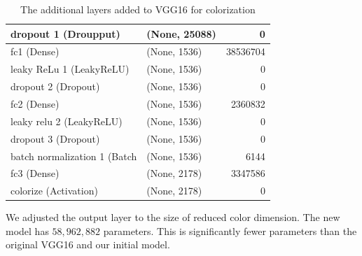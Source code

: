\documentclass[12pt]{article}
\begin{document}
\begin{table}[H]
	\caption{The additional layers added to VGG16 for colorization}
  	\centering
	\begin{tabular}{|l|l|r|}
		\hline 
		dropout 1 (Droupput)          &  (None, 25088)          &    0           \\ \hline
		fc1 (Dense)                   &  (None, 1536)           &    38536704    \\ \hline
        leaky ReLu 1 (LeakyReLU)      &  (None, 1536)           &    0           \\ \hline
        dropout 2 (Dropout)           &  (None, 1536)           &    0           \\ \hline
        fc2 (Dense)                   &  (None, 1536)           &    2360832     \\ \hline
        leaky relu 2 (LeakyReLU)      &  (None, 1536)           &    0           \\ \hline
        dropout 3 (Dropout)           &  (None, 1536)           &    0           \\ \hline
        batch normalization 1 (Batch  &  (None, 1536)           &    6144        \\ \hline
        fc3 (Dense)                   &  (None, 2178)           &    3347586     \\ \hline
        colorize (Activation)         &  (None, 2178)           &    0           \\ \hline 
	\end{tabular}
\end{table}


We adjusted the output layer to the size of reduced color dimension. The new model has $58,962,882$ parameters. This is significantly fewer parameters than the original VGG16 and our initial model.
\end{document}
